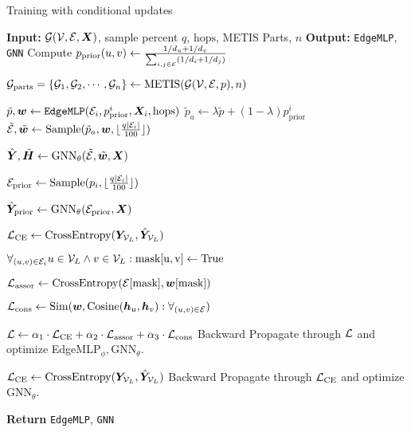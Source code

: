 \begin{algorithm}[!htbp]
\caption{\sgs Training with conditional updates}
\begin{algorithmic}[1] %
\STATE \textbf{Input:} ${\mathcal{G}} ({\mathcal{V}}, {\mathcal{E}}, {\bm{X}})$, sample percent $q$, $\mathrm{hops}$, METIS Parts, $n$
\STATE \textbf{Output:} \texttt{EdgeMLP}, \texttt{GNN}
\STATE Compute $p_\mathrm{prior}(u,v) \gets \frac{1/d_u + 1/d_v}{\sum_{i,j\in {\mathcal{E}}} (1/d_i + 1/d_j)}$

\STATE ${\mathcal{G}}_\mathrm{parts}=\{{\mathcal{G}}_1,{\mathcal{G}}_2,\cdots,{\mathcal{G}}_n\}\gets \mathrm{METIS} ({\mathcal{G}}({\mathcal{V}},{\mathcal{E}}, p), n)$


        \STATE $\tilde{p},{\bm{w}} \gets \texttt{EdgeMLP}({\mathcal{E}}_i,p^i_\mathrm{prior}, {\bm{X}}_i,\mathrm{hops})$        
        \STATE $\tilde{p}_a \gets \lambda \tilde{p}+(1-\lambda)p^i_\mathrm{prior}$
        \STATE $\tilde{{\mathcal{E}}},\tilde{{\bm{w}}} \gets \mathrm{Sample}(\tilde{p}_a,{\bm{w}},\lfloor \frac{q|{\mathcal{E}}_i|}{100} \rfloor)$ 
        
        \STATE $\hat{{\bm{Y}}}, \tilde{{\bm{H}}} \gets \mathrm{GNN}_\theta(\tilde{{\mathcal{E}}},\tilde{{\bm{w}}},{\bm{X}})$
        
        \STATE ${\mathcal{E}}_\mathrm{prior} \gets \mathrm{Sample}({p_i},\lfloor \frac{q|{\mathcal{E}}_i|}{100} \rfloor)$ 

        \STATE $\hat{{\bm{Y}}}_\mathrm{prior}  \gets \mathrm{GNN}_\theta({\mathcal{E}}_\mathrm{prior},{\bm{X}})$

            \STATE ${\mathcal{L}}_\mathrm{CE} \gets \mathrm{CrossEntropy} ({\bm{Y}}_{{\mathcal{V}}_L}, \hat{{\bm{Y}}}_{{\mathcal{V}}_L})$

            \STATE $\forall_{(u,v)\in {\mathcal{E}}_i} u \in {\mathcal{V}}_L \land v \in {\mathcal{V}}_L : \mathrm{mask[u,v]} \gets \text{True}$
        
            \STATE ${\mathcal{L}}_\mathrm{assor} \gets \mathrm{CrossEntropy}({\mathcal{E}} \mathrm{[mask]},{\bm{w}} \mathrm{[mask]})$
        
            \STATE ${\mathcal{L}}_\mathrm{cons} \gets \mathrm{Sim} ({\bm{w}}, \mathrm{Cosine}({\bm{h}}_u,{\bm{h}}_v): \forall_{(u,v)\in {\mathcal{E}}})$ 
        
            \STATE ${\mathcal{L}} \gets \alpha_1\cdot {\mathcal{L}}_\mathrm{CE}+ \alpha_2\cdot {\mathcal{L}}_\mathrm{assor}+ \alpha_3\cdot {\mathcal{L}}_\mathrm{cons}$
            \STATE Backward Propagate through ${\mathcal{L}}$ and optimize EdgeMLP$_\phi, \mathrm{GNN}_\theta$.
        
        \ELSE
            \STATE ${\mathcal{L}}_\mathrm{CE} \gets \mathrm{CrossEntropy} ({\bm{Y}}_{{\mathcal{V}}_L}, \hat{{\bm{Y}}}_{{\mathcal{V}}_L})$
            \STATE Backward Propagate through ${\mathcal{L}}_\mathrm{CE}$ and optimize $\mathrm{GNN}_\theta$.            
        \ENDIF
    
    \ENDFOR
    
\ENDFOR
\STATE \textbf{Return} \texttt{EdgeMLP}, \texttt{GNN} 
\end{algorithmic}
\label{alg:sgstrainingpriorfull}
\end{algorithm}

